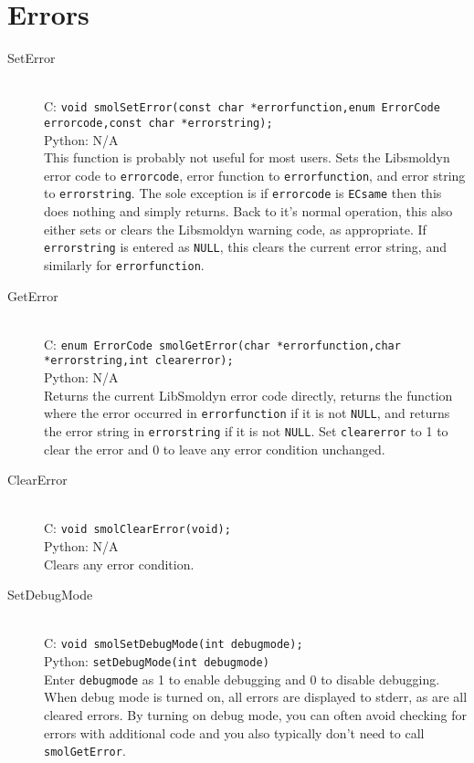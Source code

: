 \documentclass {book}
\begin{document}
\section{Errors}

\begin{description}

\item[SetError]
\hfill \\
C: \texttt{void smolSetError(const char *errorfunction,enum ErrorCode errorcode,const char *errorstring);}\\
Python: N/A\\
This function is probably not useful for most users. Sets the Libsmoldyn error code to \texttt{errorcode}, error function to \texttt{errorfunction}, and error string to \texttt{errorstring}. The sole exception is if \texttt{errorcode} is \texttt{ECsame} then this does nothing and simply returns. Back to it's normal operation, this also either sets or clears the Libsmoldyn warning code, as appropriate. If \texttt{errorstring} is entered as \texttt{NULL}, this clears the current error string, and similarly for \texttt{errorfunction}.

\item[GetError]
\hfill \\
C: \texttt{enum ErrorCode smolGetError(char *errorfunction,char *errorstring,int clearerror);}\\
Python: N/A\\
Returns the current LibSmoldyn error code directly, returns the function where the error occurred in \texttt{errorfunction} if it is not \texttt{NULL}, and returns the error string in \texttt{errorstring} if it is not \texttt{NULL}. Set \texttt{clearerror} to 1 to clear the error and 0 to leave any error condition unchanged.

\item[ClearError]
\hfill \\
C: \texttt{void smolClearError(void);}\\
Python: N/A\\
Clears any error condition.

\item[SetDebugMode]
\hfill \\
C: \texttt{void smolSetDebugMode(int debugmode);}\\
Python: \texttt{setDebugMode(int debugmode)}\\
Enter \texttt{debugmode} as 1 to enable debugging and 0 to disable debugging. When debug mode is turned on, all errors are displayed to stderr, as are all cleared errors. By turning on debug mode, you can often avoid checking for errors with additional code and you also typically don't need to call \texttt{smolGetError}.


\end{description}
\end{document}
